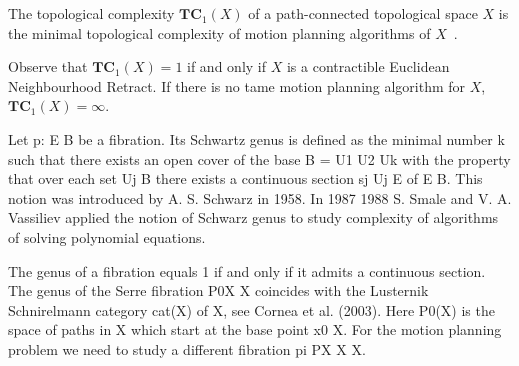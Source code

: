 \begin{definition}
  The topological complexity \(\mathbf{TC}_1(X)\) of a path-connected topological space \(X\) is the minimal topological complexity of motion planning algorithms of \(X\)~\cite{DBLP:journals/dcg/Farber03}.
\end{definition}

Observe that \(\mathbf{TC}_1(X)=1\) if and only if \(X\) is a contractible Euclidean Neighbourhood Retract.
If there is no tame motion planning algorithm for \(X\), \(\mathbf{TC}_1(X)=\infty\).

Let p: E  B be a fibration. Its Schwartz genus is defined as the minimal number
k such that there exists an open cover of the base B = U1 U2 Uk with the
property that over each set Uj B there exists a continuous section sj
 Uj E
of E B. This notion was introduced by A. S. Schwarz in 1958. In 1987
1988 S. Smale and V. A. Vassiliev applied the notion of Schwarz genus to study
complexity of algorithms of solving polynomial equations.

The genus of a fibration equals 1 if and only if it admits a continuous section.
The genus of the Serre fibration P0X X coincides with the Lusternik
Schnirelmann category cat(X) of X, see Cornea et al. (2003). Here P0(X) is the
space of paths in X which start at the base point x0 X. For the motion planning
problem we need to study a different fibration  pi PX X X.